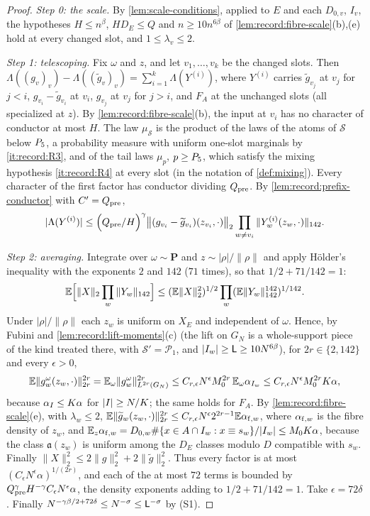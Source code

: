 \begin{proof}
\emph{Step 0: the scale.} By \cref{lem:scale-conditions}, applied to $E$ and
each $D_{0,v}$, $I_v$, the hypotheses $H\le n^\beta$, $HD_E\le Q$ and
$n\ge10n^{6\beta}$ of \cref{lem:record:fibre-scale}(b),(e) hold at every
changed slot, and $1\le\lambda_v\le2$.

\emph{Step 1: telescoping.} Fix $\omega$ and $z$, and let $v_1,\dots,v_k$ be
the changed slots. Then
$\Lambda((g_v)_v)-\Lambda((\widetilde g_v)_v)=\sum_{i=1}^k\Lambda(Y^{(i)})$,
where $Y^{(i)}$ carries $\widetilde g_{v_j}$ at $v_j$ for $j<i$,
$g_{v_i}-\widetilde g_{v_i}$ at $v_i$, $g_{v_j}$ at $v_j$ for $j>i$, and $F_A$
at the unchanged slots (all specialized at $z$). By
\cref{lem:record:fibre-scale}(b), the input at $v_i$ has no character of
conductor at most $H$. The law $\mu_{\mathcal S}$ is the product of the laws
of the atoms of $\mathcal S$ below $\Pfive$, a probability measure with
uniform one-slot marginals by \ref{it:record:R3}, and of the tail laws
$\mu_p$, $p\ge\Pfive$, which satisfy the mixing hypothesis
\ref{it:record:R4} at every slot (in the notation of
\cref{def:mixing}). Every character of the first factor has conductor
dividing $Q_{\rm pre}$. By \cref{lem:record:prefix-conductor} with
$C'=Q_{\rm pre}$,
\[
 |\Lambda(Y^{(i)})|\le\Big(\frac{Q_{\rm pre}}H\Big)^{\gamma}
 \big\|(g_{v_i}-\widetilde g_{v_i})(z_{v_i},\cdot)\big\|_2
 \prod_{w\ne v_i}\|Y^{(i)}_w(z_w,\cdot)\|_{142}.
\]

\emph{Step 2: averaging.} Integrate over $\omega\sim\mathbf P$ and
$z\sim|\rho|/\|\rho\|$ and apply H\"older's inequality with the exponents
$2$ and $142$ ($71$ times), so that $1/2+71/142=1$:
\[
 \E\Big[\|X\|_2\prod_{w}\|Y_w\|_{142}\Big]\le(\E\|X\|_2^2)^{1/2}
 \prod_w(\E\|Y_w\|_{142}^{142})^{1/142}.
\]
Under $|\rho|/\|\rho\|$ each $z_w$ is uniform on $X_E$ and independent of
$\omega$. Hence, by Fubini and \cref{lem:record:lift-moments}(c) (the lift on
$G_N$ is a whole-support piece of the kind treated there, with
$\mathcal S'=\mathcal P_1$, and $|I_w|\ge\Lsc\ge10N^{6\beta}$), for
$2r\in\{2,142\}$ and every $\epsilon>0$,
\[
 \E\|g_w^\omega(z_w,\cdot)\|_{2r}^{2r}=\E_\omega\|g_w^\omega\|_{L^{2r}(G_N)}^{2r}
 \le C_{r,\epsilon}N^\epsilon\Mzero^{2r}\,\E_\omega\alpha_{I_w}
 \le C_{r,\epsilon}N^\epsilon\Mzero^{2r}\Kint\alpha ,
\]
because $\alpha_I\le\Kint\alpha$ for $|I|\ge N/\Kint$; the same holds for
$F_A$. By \cref{lem:record:fibre-scale}(e), with $\lambda_w\le2$,
$\E\|\widetilde g_w(z_w,\cdot)\|_{2r}^{2r}\le C_{r,\epsilon}N^\epsilon2^{2r-1}
\E\alpha_{{\rm f},w}$, where $\alpha_{{\rm f},w}$ is the fibre density of
$z_w$, and
$\E_z\alpha_{{\rm f},w}=D_{0,w}\#\{x\in A\cap I_w:x\equiv s_w\}/|I_w|
\le\Mzero\Kint\alpha$, because the class $\mathfrak a(z_w)$ is uniform among the $D_E$
classes modulo $D$ compatible with $s_w$. Finally
$\|X\|_2^2\le2\|g\|_2^2+2\|\widetilde g\|_2^2$. Thus every factor is at most
$(C_\epsilon N^\epsilon\alpha)^{1/(2r)}$, and each of the at most $72$ terms
is bounded by $Q_{\rm pre}^\gamma H^{-\gamma}C_\epsilon N^{\epsilon}\alpha$,
the density exponents adding to $1/2+71/142=1$. Take $\epsilon=72\delta$.
Finally $N^{-\gamma\beta/2+72\delta}\le N^{-\sigma}\le\Lsc^{-\sigma}$ by (S1).
\end{proof}

